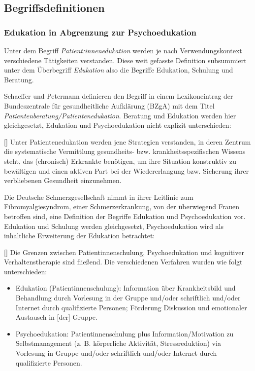 \documentclass[
  twoside,
  parskip=half-,
  paper=176mm:246mm,
  BCOR=14mm,
  DIV=14,
]{scrreprt}
\makeatletter
\renewenvironment*{displayquote}
  {\begingroup\setlength{\leftmargini}{0pt}\csq@getcargs{\csq@bdquote{}{}}}
  {\csq@edquote\endgroup}
\makeatother
\begin{document}
\subsection{Begriffsdefinitionen}

\subsubsection{Edukation in Abgrenzung zur Psychoedukation}\label{edupsycho}
Unter dem Begriff \textit{Patient:innenedukation} werden je nach Verwendungskontext verschiedene Tätigkeiten verstanden.  Diese weit gefasste Definition subsummiert unter dem Überbegriff \textit{Edukation} also die Begriffe Edukation, Schulung und Beratung.

Schaeffer und Petermann definieren den Begriff in einem Lexikoneintrag der Bundeszentrale für gesundheitliche Aufklärung (BZgA) mit dem Titel \textit{Patientenberatung/Patientenedukation}. Beratung und Edukation werden hier gleichgesetzt, Edukation und Psychoedukation nicht explizit unterschieden:

\begin{displayquote}[{\cite[vgl.]{BZGABeratungEdukation}}]
  Unter Patientenedukation werden jene Strategien verstanden, in deren Zentrum die systematische Vermittlung gesundheits- bzw. krankheitsspezifischen Wissens steht, das (chronisch) Erkrankte benötigen, um ihre Situation konstruktiv zu bewältigen und einen aktiven Part bei der Wiedererlangung bzw. Sicherung ihrer verbliebenen Gesundheit einzunehmen.
\end{displayquote}

Die Deutsche Schmerzgesellschaft nimmt in ihrer Leitlinie zum Fibromyalgiesyndrom, einer Schmerzerkrankung, von der überwiegend Frauen betroffen sind, eine Definition der Begriffe Edukation und Psychoedukation vor. Edukation und Schulung werden gleichgesetzt, Psychoedukation wird als inhaltliche Erweiterung der Edukation betrachtet:

\begin{displayquote}[{\cite[48]{LeitlinieFMS}}]
Die Grenzen zwischen Patientinnenschulung, Psychoedukation und kognitiver Verhaltenstherapie sind fließend. Die verschiedenen Verfahren wurden wie
folgt unterschieden:
\begin{itemize}
  \item Edukation (Patientinnenschulung): Information über Krankheitsbild und
  Behandlung durch Vorlesung in der Gruppe und/oder schriftlich und/oder
  Internet durch qualifizierte Personen; Förderung Diskussion und emotionaler
  Austausch in [der] Gruppe.
  \item Psychoedukation: Patientinnenschulung plus Information/Motivation zu
  Selbstmanagement (z. B. körperliche Aktivität, Stressreduktion) via Vorlesung
  in Gruppe und/oder schriftlich und/oder Internet durch qualifizierte Personen.
\end{itemize}
\end{displayquote}
\end{document}
